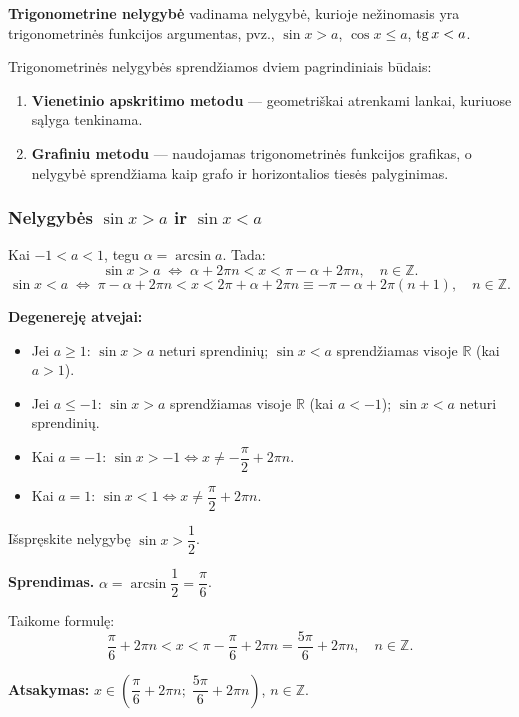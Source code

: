 \begin{definition}
\textbf{Trigonometrine nelygyb\. e} vadinama nelygybė, kurioje nežinomasis yra 
trigonometrinės funkcijos argumentas, pvz., $\sin x > a$, $\cos x \leq a$, $\operatorname{tg} x < a$.
\end{definition}

\noindent Trigonometrinės nelygybės sprendžiamos dviem pagrindiniais būdais:
\begin{enumerate}
    \item \textbf{Vienetinio apskritimo metodu} --- geometriškai atrenkami lankai, 
    kuriuose sąlyga tenkinama.
    \item \textbf{Grafiniu metodu} --- naudojamas trigonometrinės funkcijos grafikas, 
    o nelygybė sprendžiama kaip grafo ir horizontalios tiesės palyginimas.
\end{enumerate}

\subsubsection*{Nelygybės \(\sin x > a\) ir \(\sin x < a\)}

\begin{tcolorbox}[colback=orange!5, colframe=orange!60!black, 
                  title=Sprendimo formulės]
Kai $-1 < a < 1$, tegu $\alpha = \arcsin a$. Tada:
\[
    \sin x > a \;\Leftrightarrow\; \alpha + 2\pi n < x < \pi - \alpha + 2\pi n, 
    \quad n \in \mathbb{Z}.
\]
\[
    \sin x < a \;\Leftrightarrow\; \pi - \alpha + 2\pi n < x < 2\pi + \alpha + 2\pi n 
    \equiv -\pi - \alpha + 2\pi(n+1), \quad n \in \mathbb{Z}.
\]
\end{tcolorbox}

\noindent \textbf{Degenereję atvejai:}
\begin{itemize}
    \item Jei $a \geq 1$: $\sin x > a$ neturi sprendinių; $\sin x < a$ sprendžiamas 
    visoje $\mathbb{R}$ (kai $a > 1$).
    \item Jei $a \leq -1$: $\sin x > a$ sprendžiamas visoje $\mathbb{R}$ (kai $a < -1$); 
    $\sin x < a$ neturi sprendinių.
    \item Kai $a = -1$: $\sin x > -1 \Leftrightarrow x \neq -\dfrac{\pi}{2} + 2\pi n$.
    \item Kai $a = 1$: $\sin x < 1 \Leftrightarrow x \neq \dfrac{\pi}{2} + 2\pi n$.
\end{itemize}

\begin{example}
Išspręskite nelygybę $\sin x > \dfrac{1}{2}$.

\textbf{Sprendimas.} $\alpha = \arcsin\dfrac{1}{2} = \dfrac{\pi}{6}$.

Taikome formulę:
\[
    \frac{\pi}{6} + 2\pi n < x < \pi - \frac{\pi}{6} + 2\pi n 
    = \frac{5\pi}{6} + 2\pi n, \quad n \in \mathbb{Z}.
\]

\textbf{Atsakymas:} $x \in \left(\dfrac{\pi}{6} + 2\pi n;\; \dfrac{5\pi}{6} + 2\pi n\right)$, 
$n \in \mathbb{Z}$.
\end{example}

